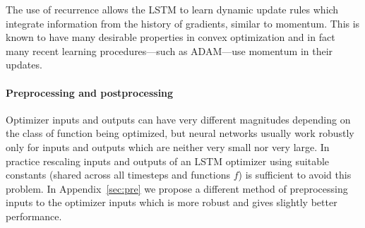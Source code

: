 The use of recurrence allows the LSTM to learn dynamic update rules which
integrate information from the history of gradients, similar to momentum. This
is known to have many desirable properties in convex optimization
\citep[see e.g.][]{nesterov:1983} and in fact many recent learning
procedures---such as ADAM---use momentum in their updates.

\paragraph{Preprocessing and postprocessing}

Optimizer inputs and outputs can have very different magnitudes depending on
the class of function being optimized, but neural networks usually work
robustly only for inputs and outputs which are neither very small nor very
large. In practice rescaling inputs and outputs of an LSTM optimizer using
suitable constants (shared across all timesteps and functions $f$) is
sufficient to avoid this problem. In Appendix~\ref{sec:pre} we propose a
different method of preprocessing inputs to the optimizer inputs which is more
robust and gives slightly better performance.


